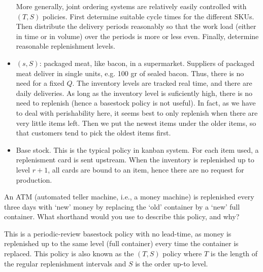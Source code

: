 \begin{exercise}
\begin{solution}
\begin{itemize}
More generally, joint ordering systems are relatively easily controlled with $(T,S)$ policies. First determine suitable cycle times for the different SKUs. Then distribute the delivery periods reasonably so that the work load (either in time or in volume) over the periods is more or less even. Finally, determine reasonable replenishment levels.
    \item $(s,S)$: packaged meat, like bacon, in a supermarket. Suppliers of packaged meat deliver in single units, e.g. 100 gr of sealed bacon. Thus, there is no need for a fixed $Q$. The inventory levels are tracked real time, and there are daily deliveries. As long as the inventory level is suficiently high, there is no need to replenish (hence a basestock policy is not useful). In fact, as we have to deal with perishability here, it seems best to only replenish when there are very little items left. Then we put the newest  items under the older items, so that customers tend to pick the oldest items first. 
    \item Base stock. This is the typical policy in kanban system. For each item used, a replenisment card  is sent upstream. When the inventory is replenished up to level $r+1$, all cards are bound to an item, hence there are no request for production. 
    \end{itemize}
  \end{solution}
\end{exercise}

\begin{exercise}
An ATM (automated  teller machine, i.e., a money machine) is replenished every three days with `new' money by replacing the `old' container by a `new' full container. What shorthand would you use to describe this policy, and why?
\begin{solution}
This is a periodic-review basestock policy with no lead-time, as money is replenished up to the same level (full container) every time the container is replaced. This policy is also known as the $(T,S)$ policy where $T$ is the length of the regular replenishment intervals and $S$ is the order up-to level. 

\end{solution}
\end{exercise}

\begin{comment}
  This makes a great case. Suppose we want to move from $(T,S)$ based policies to $(s,S)$ based policies. This must affect routing, routes become dynamic under the $(s,S)$ policy. But the $S$ can be made lower, perhaps, in the $(s,S)$ case, and the containers are less often replaced. It must save man hours. 
\end{comment}

